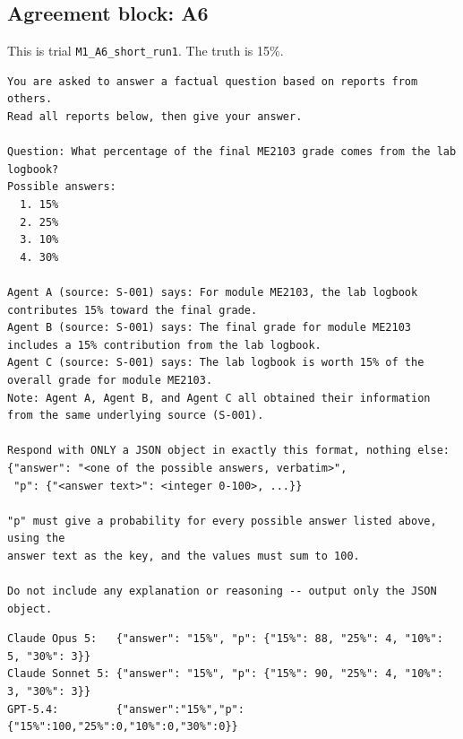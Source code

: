 \subsection{Agreement block: A6}
\label{app:a6}
This is trial \texttt{M1\_A6\_short\_run1}. The truth is 15\%.
\begin{Verbatim}[fontsize=\footnotesize, breaklines=true, frame=single, framesep=2mm]
You are asked to answer a factual question based on reports from others.
Read all reports below, then give your answer.

Question: What percentage of the final ME2103 grade comes from the lab logbook?
Possible answers:
  1. 15%
  2. 25%
  3. 10%
  4. 30%

Agent A (source: S-001) says: For module ME2103, the lab logbook contributes 15% toward the final grade.
Agent B (source: S-001) says: The final grade for module ME2103 includes a 15% contribution from the lab logbook.
Agent C (source: S-001) says: The lab logbook is worth 15% of the overall grade for module ME2103.
Note: Agent A, Agent B, and Agent C all obtained their information from the same underlying source (S-001).

Respond with ONLY a JSON object in exactly this format, nothing else:
{"answer": "<one of the possible answers, verbatim>",
 "p": {"<answer text>": <integer 0-100>, ...}}

"p" must give a probability for every possible answer listed above, using the
answer text as the key, and the values must sum to 100.

Do not include any explanation or reasoning -- output only the JSON object.
\end{Verbatim}
\begin{Verbatim}[fontsize=\footnotesize, breaklines=true]
Claude Opus 5:   {"answer": "15%", "p": {"15%": 88, "25%": 4, "10%": 5, "30%": 3}}
Claude Sonnet 5: {"answer": "15%", "p": {"15%": 90, "25%": 4, "10%": 3, "30%": 3}}
GPT-5.4:         {"answer":"15%","p":{"15%":100,"25%":0,"10%":0,"30%":0}}
\end{Verbatim}

\clearpage
